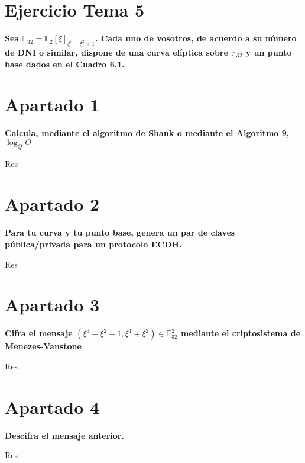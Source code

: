 \documentclass[a4paper]{article}
\title {\fbox{\Huge{\textbf{Ejercicio Tema 5}}}}
\author {\fbox{Ana Buendía Ruiz-Azuaga}}
\begin{document}
\maketitle


\section{Ejercicio Tema 5}

\textbf{Sea $\mathbb{F}_{32}=\mathbb{F}_{2}[\xi]_{\xi^5+\xi^2+1}$. Cada uno de vosotros, de acuerdo a su número de DNI o similar, dispone de una curva elíptica sobre $\mathbb{F}_{32}$ y un punto base dados en el Cuadro 6.1.}

\section{Apartado 1}

\textbf{Calcula, mediante el algoritmo de Shank o mediante el Algoritmo 9, $\log_{Q}O$}

Res

\section{Apartado 2}

\textbf{Para  tu  curva  y  tu  punto  base,  genera  un  par  de  claves  pública/privada para un protocolo ECDH.}

Res

\section{Apartado 3}

\textbf{Cifra el mensaje $(\xi^3+\xi^2+1,\xi^4+\xi^2)\in \mathbb{F}^2_{32}$ mediante el criptosistema de Menezes-Vanstone}

Res

\section{Apartado 4}

\textbf{Descifra el mensaje anterior.}

Res
\end{document}
